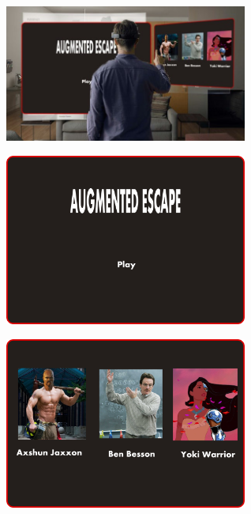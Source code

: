 \documentclass[11pt]{article}
\begin{document}
\begin{center}
\includegraphics[width=8cm]{./img/main-menu-1.jpg}
\end{center}

\begin{center}
\includegraphics[width=8cm]{./img/start-screen.png}
\end{center}

\begin{center}
\includegraphics[width=8cm]{./img/character-select.png}
\end{center}
\end{document}
